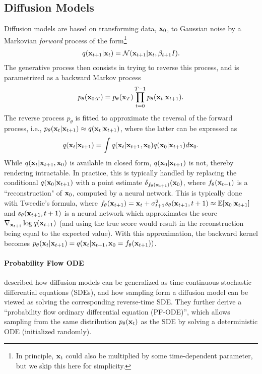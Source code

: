 \documentclass{proc}
\begin{document}
\subsection{Diffusion Models}
\label{sec:diffmodels}
Diffusion models are based on transforming data, $\mathbf{x}_0$, to Gaussian noise by a Markovian \emph{forward} process of the form\footnote{In principle, $\mathbf{x}_{t}$ could also be multiplied by some time-dependent parameter, but we skip this here for simplicity.}
\begin{align}
    q(\mathbf{x}_{t+1}|\mathbf{x}_{t}) = \mathcal{N}(\mathbf{x}_{t+1}|\mathbf{x}_{t}, \beta_{t+1}I). \label{eq:difftrans}
\end{align}
The generative process then consists in trying to reverse this process, and is parametrized as a backward Markov process
\begin{align}
    p_\theta(\mathbf{x}_{0:T}) = p_\theta(\mathbf{x}_T)\prod_{t=0}^{T-1} p_\theta(\mathbf{x}_{t}|\mathbf{x}_{t+1}). \label{eq:diffbackward_seq}
\end{align}
The reverse process $p_\theta$ is fitted to approximate the reversal of the forward process, i.e., $p_\theta(\mathbf{x}_{t}|\mathbf{x}_{t+1}) \approx q(\mathbf{x}_{t}|\mathbf{x}_{t+1})$, where the latter can be expressed as 
\begin{align}
q(\mathbf{x}_{t}|\mathbf{x}_{t+1}) = \int q(\mathbf{x}_{t}|\mathbf{x}_{t+1}, \mathbf{x}_0)q(\mathbf{x}_0|\mathbf{x}_{t+1})d\mathbf{x}_0. \label{eq:diffbackwardint}
\end{align}
While $q(\mathbf{x}_{t}|\mathbf{x}_{t+1}, \mathbf{x}_0)$ is available in closed form, $q(\mathbf{x}_0|\mathbf{x}_{t+1})$ is not, thereby rendering  intractable. In practice, this is typically handled by replacing the conditional $q(\mathbf{x}_0|\mathbf{x}_{t+1})$ with a point estimate $\delta_{f_\theta(\mathbf{x}_{t+1})}(\mathbf{x}_0)$, where $f_\theta(\mathbf{x}_{t+1})$ is a ``reconstruction" of $\mathbf{x}_0$, computed by a neural network. This is typically done with Tweedie's formula, where $f_\theta(\mathbf{x}_{t+1}) = \mathbf{x}_{t} + \sigma_{t+1}^2 s_\theta(\mathbf{x}_{t+1}, t+1) \approx \mathbb{E}[\mathbf{x}_0|\mathbf{x}_{t+1}]$ and $s_\theta(\mathbf{x}_{t+1}, t+1)$ is a neural network which approximates the score $\nabla_{\mathbf{x}_{t+1}}\log q(\mathbf{x}_{t+1})$ (and using the true score would result in the reconstruction being equal to the expected value). With this approximation, the backward kernel becomes $p_\theta(\mathbf{x}_{t}|\mathbf{x}_{t+1}) = q(\mathbf{x}_{t}|\mathbf{x}_{t+1}, \mathbf{x}_0=f_\theta(\mathbf{x}_{t+1}))$. 

\paragraph{Probability Flow ODE}
\citet{song_score-based_2021} described how diffusion models can be generalized as time-continuous stochastic differential equations (SDEs), and how sampling form a diffusion model can be viewed as solving the corresponding reverse-time SDE. They further derive a ``probability flow ordinary differential equation (PF-ODE)'', which allows sampling from the same distribution $p_\theta(\mathbf{x}_{t})$ as the SDE by solving a deterministic ODE (initialized randomly).
\end{document}
